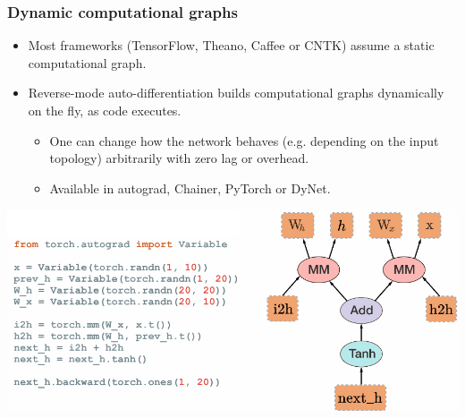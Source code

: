 \documentclass{beamer}
\begin{document}
\begin{frame}
    \frametitle{Dynamic computational graphs}

    \begin{itemize}
        \item Most frameworks (TensorFlow, Theano, Caffee or CNTK) assume a static computational graph.
        \item Reverse-mode auto-differentiation builds computational graphs dynamically on the fly, as code executes.

        \begin{itemize}
            \item One can change how the network behaves (e.g. depending on the input topology) arbitrarily with zero lag or overhead.
            \item Available in autograd, Chainer, PyTorch or DyNet.
        \end{itemize}
    \end{itemize}

    \centering
    \includegraphics[scale=0.3]{figures/pytorch.png}


\end{frame}
\end{document}
